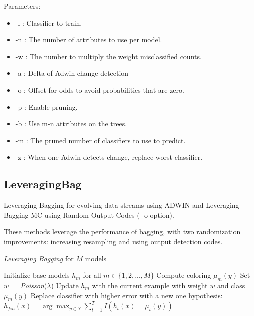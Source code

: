 \documentclass[a4paper,12pt,twoside]{book}
\begin{document}
Parameters:
\begin{itemize}
\item -l : Classifier to train.
\item -n : The number of attributes to use per model.
\item -w : The number to multiply the weight misclassified counts.
\item -a : Delta of Adwin change detection
\item -o : Offset for odds to avoid probabilities that are zero.
\item -p : Enable pruning.
\item -b : Use m-n attributes on the trees.
\item -m : The pruned number of classifiers to use to predict.
\item -z : When one Adwin detects change, replace worst classifier.
\end{itemize}

\subsection{LeveragingBag}
  Leveraging Bagging for evolving data streams using ADWIN and Leveraging Bagging MC
 using Random Output Codes ( -o option).

These methods leverage the performance of bagging, with two randomization improvements: increasing resampling and using output detection codes.


\begin{algorithm}[h]
\caption{{\em Leveraging  Bagging} for $M$ models} %
\begin{algorithmic}[1]
\STATE Initialize base models $h_{m}$ for all $m \in \{1,2,...,M\}$
\STATE Compute coloring $\mu_m(y)$
{}
\STATE Set $w = $ {\em Poisson}($\lambda$)
\STATE Update $h_{m}$ with the current example with weight $w$ and class $\mu_m(y)$
\ENDFOR
\ENDFOR
{}
\STATE Replace classifier with higher error with a new one 
\ENDIF
{}
\RETURN hypothesis: $h_{fin}(x) = \arg \max_{y \in Y} \sum_{t=1}^{T} I(h_{t}(x) =\mu_t( y))$
\end{algorithmic}
\label{alg:levbag}
\end{algorithm}
\end{document}
